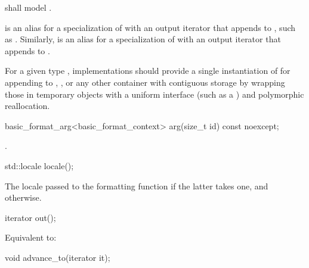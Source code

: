 \pnum
{} shall model .

\pnum
{}%
 is an alias for
a specialization of 
with an output iterator
that appends to ,
such as .
%
Similarly,  is an alias for
a specialization of 
with an output iterator
that appends to .

\pnum
\recommended
For a given type ,
implementations should provide
a single instantiation of 
for appending to
,
,
or any other container with contiguous storage
by wrapping those in temporary objects with a uniform interface
(such as a ) and polymorphic reallocation.

%
\begin{itemdecl}
basic_format_arg<basic_format_context> arg(size_t id) const noexcept;
\end{itemdecl}

\begin{itemdescr}
\pnum
\returns
{}.
\end{itemdescr}

%
\begin{itemdecl}
std::locale locale();
\end{itemdecl}

\begin{itemdescr}
\pnum
\returns
The locale passed to the formatting function
if the latter takes one,
and  otherwise.
\end{itemdescr}

%
\begin{itemdecl}
iterator out();
\end{itemdecl}

\begin{itemdescr}
\pnum
\effects
Equivalent to: 
\end{itemdescr}

%
\begin{itemdecl}
void advance_to(iterator it);
\end{itemdecl}

